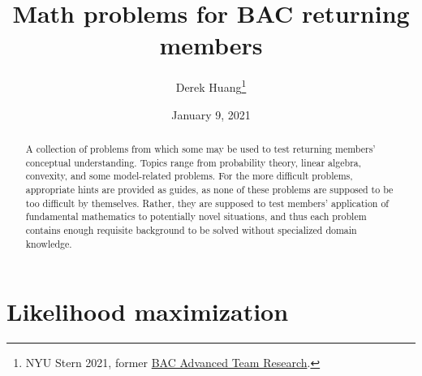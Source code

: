\documentclass{article}
\title{Math problems for BAC returning members}
\author{
    Derek Huang\thanks{
        NYU Stern 2021, former \href{
            https://sternbac.org/insightteam.html
        }{BAC Advanced Team Research}.
    }
}
\date{January 9, 2021}
\numberwithin{equation}{section}
\begin{document}
\maketitle

\begin{abstract}
    A collection of problems from which some may be used to test returning
    members' conceptual understanding. Topics range from probability theory,
    linear algebra, convexity, and some model-related problems. For the more
    difficult problems, appropriate hints are provided as guides, as none of
    these problems are supposed to be too difficult by themselves. Rather, they
    are supposed to test members' application of fundamental mathematics to
    potentially novel situations, and thus each problem contains enough
    requisite background to be solved without specialized domain knowledge.
\end{abstract}

\section{Likelihood maximization}
\end{document}
